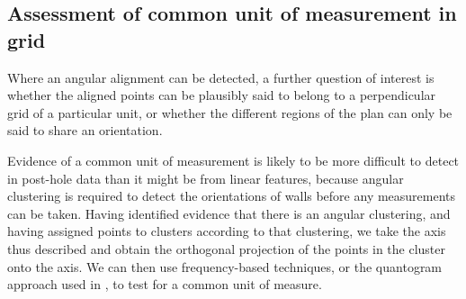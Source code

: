 \documentclass[../../ArchStats.tex]{subfiles}
\begin{document}

\subsection{Assessment of common unit of measurement in grid}

Where an angular alignment can be detected, a further question of interest is whether the aligned points can be plausibly said to belong to a perpendicular grid of a particular unit, or whether the different regions of the plan can only be said to share an orientation.

Evidence of a common unit of measurement is likely to be more difficult to detect in post-hole data than it might be from linear features, because angular clustering is required to detect the orientations of walls before any measurements can be taken. Having identified evidence that there is an angular clustering, and having assigned points to clusters according to that clustering, we take the axis thus described and obtain the orthogonal projection of the points in the cluster onto the axis. We can then use frequency-based techniques, or the quantogram approach used in \cite{Kendall2013}, to test  for a common unit of measure.







\end{document}
